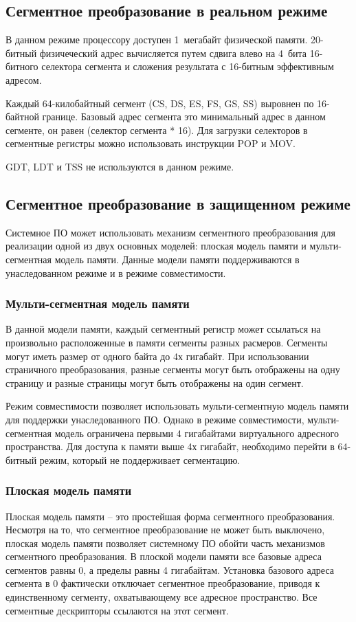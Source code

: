\subsection{Сегментное преобразование в реальном режиме}
В данном режиме процессору доступен 1~мегабайт физической памяти. 20-битный физичеческий адрес вычисляется
путем сдвига влево на 4~бита 16-битного селектора сегмента и сложения результата с 16-битным эффективным адресом.

Каждый 64-килобайтный сегмент (CS, DS, ES, FS, GS, SS) выровнен по 16-байтной границе. Базовый адрес сегмента это
минимальный адрес в данном сегменте, он равен (селектор сегмента * 16). Для загрузки селекторов в сегментные регистры
можно использовать инструкции POP и MOV.

GDT, LDT и TSS не используются в данном режиме.

\subsection{Сегментное преобразование в защищенном режиме}
Системное ПО может использовать механизм сегментного преобразования для реализации одной из двух основных
моделей: плоская модель памяти и мульти-сегментная модель памяти. Данные модели памяти поддерживаются в
унаследованном режиме и в режиме совместимости.

\subsubsection*{Мульти-сегментная модель памяти}
В данной модели памяти, каждый сегментный регистр может ссылаться на произвольно расположенные в памяти сегменты разных расмеров.
Сегменты могут иметь размер от одного байта до 4х гигабайт. При использовании страничного преобразования, разные сегменты
могут быть отображены на одну страницу и разные страницы могут быть отображены на один сегмент.

Режим совместимости позволяет использовать мульти-сегментную модель памяти для поддержки унаследованного ПО.
Однако в режиме совместимости, мульти-сегментная модель ограничена первыми 4 гигабайтами виртуального
адресного пространства. Для доступа к памяти выше 4х гигабайт, необходимо перейти в 64-битный режим, который
не поддерживает сегментацию.

\subsubsection*{Плоская модель памяти}
Плоская модель памяти -- это простейшая форма сегментного преобразования. Несмотря на то, что сегментное преобразование
не может быть выключено, плоская модель памяти позволяет системному ПО обойти часть механизмов сегментного преобразования.
В плоской модели памяти все базовые адреса сегментов равны 0, а пределы равны 4 гигабайтам. Установка
базового адреса сегмента в 0 фактически отключает сегментное преобразование, приводя к единственному сегменту,
охватывающему все адресное пространство. Все сегментные дескрипторы ссылаются на этот сегмент.

